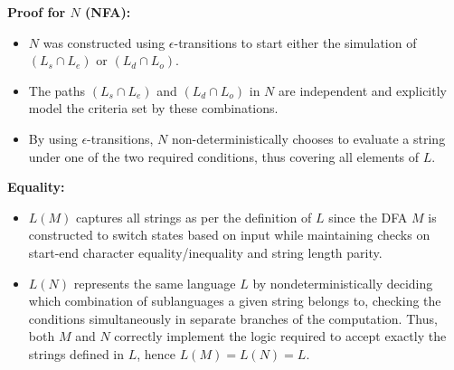 \documentclass[a4paper]{article}
\begin{document}
\begin{enumerate}
\begin{enumerate}
            \textbf{Proof for $N$ (NFA):}
            \begin{itemize}
                \item $N$ was constructed using $\epsilon$-transitions to start either the simulation of $(L_s \cap L_e)$ or $(L_d \cap L_o)$.
                \item The paths $(L_s \cap L_e)$ and $(L_d \cap L_o)$ in $N$ are independent and explicitly model the criteria set by these combinations.
                \item By using $\epsilon$-transitions, $N$ non-deterministically chooses to evaluate a string under one of the two required conditions, thus covering all elements of $L$. \\
            \end{itemize}

            \textbf{Equality:}
            \begin{itemize}
                \item $L(M)$ captures all strings as per the definition of $L$ since the DFA $M$ is constructed to switch states based on input while maintaining checks on start-end character equality/inequality and string length parity.
                \item $L(N)$ represents the same language $L$ by nondeterministically deciding which combination of sublanguages a given string belongs to, checking the conditions simultaneously in separate branches of the computation. Thus, both $M$ and $N$ correctly implement the logic required to accept exactly the strings defined in $L$, hence $L(M) = L(N) = L$. \\
            \end{itemize}
        \end{enumerate}



\end{enumerate}
\end{document}
